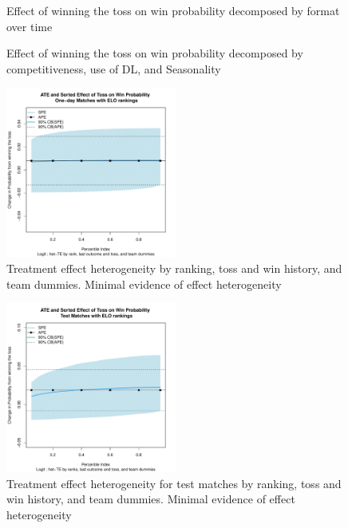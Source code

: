 \documentclass[11pt,  letterpaper]{article}
\begin{document}

\begin{figure}[b]
  \centering
  \caption{Effect of winning the toss on win probability decomposed by format over time}
  \label{fig:rf_het_TE2}
\end{figure}

\begin{figure}[b]
  \centering
  \caption{Effect of winning the toss on win probability decomposed by competitiveness, use of DL, and Seasonality}
  \label{fig:rf_het_TE3}
\end{figure}

\begin{figure}
    \centering
    \includegraphics[width=0.5\textwidth]{output/het_rank_te_odi.pdf}
    \caption{Treatment effect heterogeneity by ranking, toss and win history, and team dummies. Minimal evidence of effect heterogeneity}
    \label{fig:omni_het_odi}
\end{figure}

\begin{figure}
    \centering
    \includegraphics[width=0.5\textwidth]{output/het_rank_te_test.pdf}
    \caption{Treatment effect heterogeneity for test matches by ranking, toss and win history, and team dummies. Minimal evidence of effect heterogeneity}
    \label{fig:omni_het_test}
\end{figure}
\end{document}
